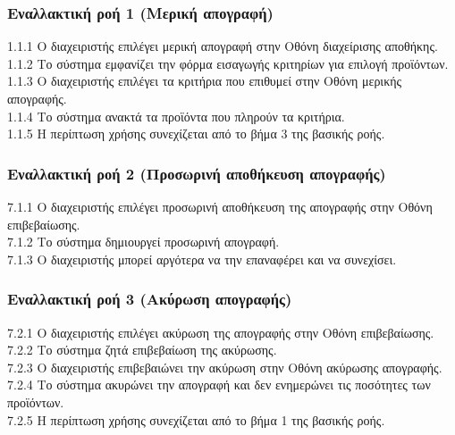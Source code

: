 \documentclass[12pt,a4paper,twoside]{book}
\begin{document}
\subsubsection*{Εναλλακτική ροή 1 (Μερική απογραφή)}
1.1.1 Ο διαχειριστής επιλέγει μερική απογραφή στην Οθόνη διαχείρισης αποθήκης.\\
\hspace*{\parindent}1.1.2 Το σύστημα εμφανίζει την φόρμα εισαγωγής κριτηρίων για επιλογή προϊόντων.\\
\hspace*{\parindent}1.1.3 Ο διαχειριστής επιλέγει τα κριτήρια που επιθυμεί στην Οθόνη μερικής απογραφής.\\
\hspace*{\parindent}1.1.4 Το σύστημα ανακτά τα προϊόντα που πληρούν τα κριτήρια.\\
\hspace*{\parindent}1.1.5 Η περίπτωση χρήσης συνεχίζεται από το βήμα 3 της βασικής ροής.

\subsubsection*{Εναλλακτική ροή 2 (Προσωρινή αποθήκευση απογραφής)}
7.1.1 Ο διαχειριστής επιλέγει προσωρινή αποθήκευση της απογραφής στην Οθόνη επιβεβαίωσης.\\
\hspace*{\parindent}7.1.2 Το σύστημα δημιουργεί προσωρινή απογραφή.\\
\hspace*{\parindent}7.1.3 Ο διαχειριστής μπορεί αργότερα να την επαναφέρει και να συνεχίσει.

\subsubsection*{Εναλλακτική ροή 3 (Ακύρωση απογραφής)}
7.2.1 Ο διαχειριστής επιλέγει ακύρωση της απογραφής στην Οθόνη επιβεβαίωσης.\\
\hspace*{\parindent}7.2.2 Το σύστημα ζητά επιβεβαίωση της ακύρωσης.\\
\hspace*{\parindent}7.2.3 Ο διαχειριστής επιβεβαιώνει την ακύρωση στην Οθόνη ακύρωσης απογραφής.\\
\hspace*{\parindent}7.2.4 Το σύστημα ακυρώνει την απογραφή και δεν ενημερώνει τις ποσότητες των προϊόντων.\\
\hspace*{\parindent}7.2.5 Η περίπτωση χρήσης συνεχίζεται από το βήμα 1 της βασικής ροής.
\end{document}
